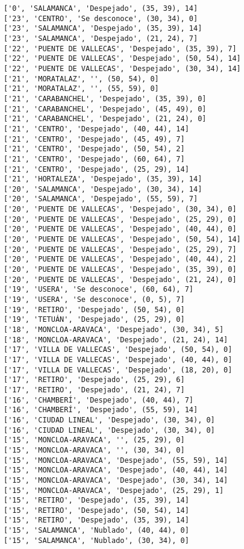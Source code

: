 \documentclass[11pt]{article}
\begin{document}
\begin{Verbatim}[commandchars=\\\{\}]
['0', 'SALAMANCA', 'Despejado', (35, 39), 14]
['23', 'CENTRO', 'Se desconoce', (30, 34), 0]
['23', 'SALAMANCA', 'Despejado', (35, 39), 14]
['23', 'SALAMANCA', 'Despejado', (21, 24), 7]
['22', 'PUENTE DE VALLECAS', 'Despejado', (35, 39), 7]
['22', 'PUENTE DE VALLECAS', 'Despejado', (50, 54), 14]
['22', 'PUENTE DE VALLECAS', 'Despejado', (30, 34), 14]
['21', 'MORATALAZ', '', (50, 54), 0]
['21', 'MORATALAZ', '', (55, 59), 0]
['21', 'CARABANCHEL', 'Despejado', (35, 39), 0]
['21', 'CARABANCHEL', 'Despejado', (45, 49), 0]
['21', 'CARABANCHEL', 'Despejado', (21, 24), 0]
['21', 'CENTRO', 'Despejado', (40, 44), 14]
['21', 'CENTRO', 'Despejado', (45, 49), 7]
['21', 'CENTRO', 'Despejado', (50, 54), 2]
['21', 'CENTRO', 'Despejado', (60, 64), 7]
['21', 'CENTRO', 'Despejado', (25, 29), 14]
['21', 'HORTALEZA', 'Despejado', (35, 39), 14]
['20', 'SALAMANCA', 'Despejado', (30, 34), 14]
['20', 'SALAMANCA', 'Despejado', (55, 59), 7]
['20', 'PUENTE DE VALLECAS', 'Despejado', (30, 34), 0]
['20', 'PUENTE DE VALLECAS', 'Despejado', (25, 29), 0]
['20', 'PUENTE DE VALLECAS', 'Despejado', (40, 44), 0]
['20', 'PUENTE DE VALLECAS', 'Despejado', (50, 54), 14]
['20', 'PUENTE DE VALLECAS', 'Despejado', (25, 29), 7]
['20', 'PUENTE DE VALLECAS', 'Despejado', (40, 44), 2]
['20', 'PUENTE DE VALLECAS', 'Despejado', (35, 39), 0]
['20', 'PUENTE DE VALLECAS', 'Despejado', (21, 24), 0]
['19', 'USERA', 'Se desconoce', (60, 64), 7]
['19', 'USERA', 'Se desconoce', (0, 5), 7]
['19', 'RETIRO', 'Despejado', (50, 54), 0]
['19', 'TETUÁN', 'Despejado', (25, 29), 0]
['18', 'MONCLOA-ARAVACA', 'Despejado', (30, 34), 5]
['18', 'MONCLOA-ARAVACA', 'Despejado', (21, 24), 14]
['17', 'VILLA DE VALLECAS', 'Despejado', (50, 54), 0]
['17', 'VILLA DE VALLECAS', 'Despejado', (40, 44), 0]
['17', 'VILLA DE VALLECAS', 'Despejado', (18, 20), 0]
['17', 'RETIRO', 'Despejado', (25, 29), 6]
['17', 'RETIRO', 'Despejado', (21, 24), 7]
['16', 'CHAMBERÍ', 'Despejado', (40, 44), 7]
['16', 'CHAMBERÍ', 'Despejado', (55, 59), 14]
['16', 'CIUDAD LINEAL', 'Despejado', (30, 34), 0]
['16', 'CIUDAD LINEAL', 'Despejado', (30, 34), 0]
['15', 'MONCLOA-ARAVACA', '', (25, 29), 0]
['15', 'MONCLOA-ARAVACA', '', (30, 34), 0]
['15', 'MONCLOA-ARAVACA', 'Despejado', (55, 59), 14]
['15', 'MONCLOA-ARAVACA', 'Despejado', (40, 44), 14]
['15', 'MONCLOA-ARAVACA', 'Despejado', (30, 34), 14]
['15', 'MONCLOA-ARAVACA', 'Despejado', (25, 29), 1]
['15', 'RETIRO', 'Despejado', (35, 39), 14]
['15', 'RETIRO', 'Despejado', (50, 54), 14]
['15', 'RETIRO', 'Despejado', (35, 39), 14]
['15', 'SALAMANCA', 'Nublado', (40, 44), 0]
['15', 'SALAMANCA', 'Nublado', (30, 34), 0]

\end{Verbatim}
\end{document}
